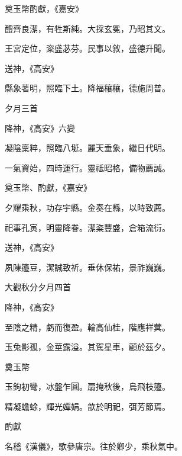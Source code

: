 \begin{pinyinscope}
 奠玉幣酌獻，《嘉安》



 醴齊良潔，有牲斯純。大採玄冕，乃昭其文。



 王宮定位，粢盛苾芬。民事以敘，盛德升聞。



 送神，《高安》



 縣象著明，照臨下土。降福穰穰，德施周普。



 夕月三首



 降神，《高安》六變



 凝陰稟粹，照臨八埏。麗天垂象，繼日代明。



 一氣資始，四時運行。靈祗昭格，備物薦誠。



 奠玉幣、酌獻，《嘉安》



 夕耀乘秋，功存宇縣。金奏在縣，以時致薦。



 祀事孔寅，明靈降眷。潔粢豐盛，倉箱流衍。



 送神，《高安》



 夙陳籩豆，潔誠致祈。垂休保祐，景祚巍巍。



 大觀秋分夕月四首



 降神，《高安》



 至陰之精，虧而復盈。輪高仙桂，階應祥蓂。



 玉兔影孤，金莖露溢。其駕星車，顧於茲夕。



 奠玉幣



 玉鉤初彎，冰盤乍圓。扇掩秋後，烏飛枝籩。



 精凝蟾蜍，輝光嬋娟。歆於明祀，弭芳節焉。



 酌獻



 名稽《漢儀》，歌參唐宗。往於卿少，乘秋氣中。




\end{pinyinscope}
